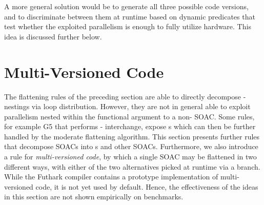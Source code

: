 A more general solution would be to generate all three possible code
versions, and to discriminate between them at runtime based on dynamic
predicates that test whether the exploited parallelism is enough to
fully utilize hardware.  This idea is discussed further below.

\section{Multi-Versioned Code}
\label{sec:multi-versioned-code}

The flattening rules of the preceding section are able to directly
decompose -nestings via loop distribution.  However, they are
not in general able to exploit parallelism nested within the
functional argument to a non- SOAC.  Some rules, for example
G5 that performs - interchange, expose s
which can then be further handled by the moderate flattening
algorithm.  This section presents further rules that decompose SOACs
into s and other SOACs.  Furthermore, we also introduce a rule
for \textit{multi-versioned code}, by which a single SOAC may be
flattened in two different ways, with either of the two alternatives
picked at runtime via a branch.  While the Futhark compiler contains a
prototype implementation of multi-versioned code, it is not yet used
by default.  Hence, the effectiveness of the ideas in this section are
not shown empirically on benchmarks.



